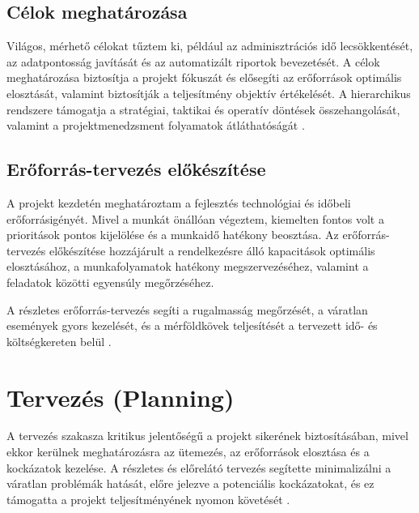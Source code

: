 \subsection{Célok meghatározása}

Világos, mérhető célokat tűztem ki, például az adminisztrációs idő lecsökkentését, az adatpontosság javítását és az automatizált riportok bevezetését.  
A célok meghatározása biztosítja a projekt fókuszát és elősegíti az erőforrások optimális elosztását, valamint biztosítják a teljesítmény objektív értékelését.
A hierarchikus rendszere támogatja a stratégiai, taktikai és operatív döntések összehangolását, valamint a projektmenedzsment folyamatok átláthatóságát \cite{Hajdu2014,Szalay2018}.

\subsection{Erőforrás-tervezés előkészítése}

A projekt kezdetén meghatároztam a fejlesztés technológiai és időbeli erőforrásigényét.  
Mivel a munkát önállóan végeztem, kiemelten fontos volt a prioritások pontos kijelölése és a munkaidő hatékony beosztása.  
Az erőforrás-tervezés előkészítése hozzájárult a rendelkezésre álló kapacitások optimális elosztásához, 
a munkafolyamatok hatékony megszervezéséhez, valamint a feladatok közötti egyensúly megőrzéséhez. 

A részletes erőforrás-tervezés segíti a rugalmasság megőrzését, a váratlan események gyors kezelését,  
és a mérföldkövek teljesítését a tervezett idő- és költségkereten belül \cite{Kovacs2016,Kaposi2019,Hajdu2014}.  

\section{Tervezés (Planning)}

A tervezés szakasza kritikus jelentőségű a projekt sikerének biztosításában, mivel ekkor kerülnek meghatározásra az ütemezés, az erőforrások elosztása és a kockázatok kezelése. 
A részletes és előrelátó tervezés segítette minimalizálni a váratlan problémák hatását, előre jelezve a potenciális kockázatokat, 
és ez támogatta a projekt teljesítményének nyomon követését \cite{Hajdu2014,Szalay2018,Kovacs2016,Kaposi2019}.

